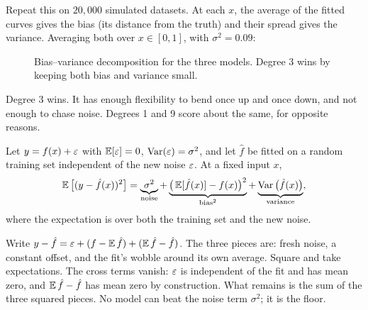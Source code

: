 Repeat this on $20{,}000$ simulated datasets. At each $x$, the average of the fitted curves
gives the bias (its distance from the truth) and their spread gives the variance. Averaging
both over $x\in[0,1]$, with $\sigma^2=0.09$:

\begin{figure}[H]
\centering
{}
\caption{Bias--variance decomposition for the three models. Degree 3 wins by keeping both bias and variance small.}
\label{fig:ml-biasvar-bars}
\end{figure}

Degree 3 wins. It has enough flexibility to bend once up and once down, and not enough to chase
noise. Degrees 1 and 9 score about the same, for opposite reasons.

\begin{theorem}
Let $y=f(x)+\varepsilon$ with $\operatorname{\mathbb{E}}[\varepsilon]=0$, $\operatorname{Var}(\varepsilon)=\sigma^2$, and let $\hat f$ be fitted on a
random training set independent of the new noise $\varepsilon$. At a fixed input $x$,
\[
\operatorname{\mathbb{E}}\big[(y-\hat f(x))^2\big]
= \underbrace{\sigma^2}_{\text{noise}}
+ \underbrace{\big(\operatorname{\mathbb{E}}[\hat f(x)]-f(x)\big)^2}_{\text{bias}^2}
+ \underbrace{\operatorname{Var}\big(\hat f(x)\big)}_{\text{variance}} ,
\]
where the expectation is over both the training set and the new noise.
\end{theorem}

\begin{whybox}
Write $y-\hat f = \varepsilon + (f-\operatorname{\mathbb{E}}\hat f) + (\operatorname{\mathbb{E}}\hat f-\hat f)$. The three pieces are: fresh noise,
a constant offset, and the fit's wobble around its own average. Square and take expectations.
The cross terms vanish: $\varepsilon$ is independent of the fit and has mean zero, and
$\operatorname{\mathbb{E}}\hat f-\hat f$ has mean zero by construction. What remains is the sum of the three squared
pieces. No model can beat the noise term $\sigma^2$; it is the floor.
\end{whybox}

